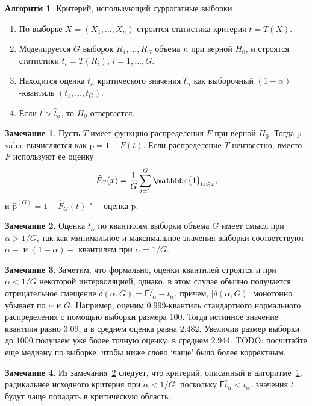 \documentclass[specialist,
substylefile = spbu_report.rtx,
subf,href,colorlinks=true, 12pt]{disser}
\theoremstyle{definition}
\newtheorem{algorithm}{Алгоритм}
\newtheorem{remark}{Замечание}
\begin{document}
\begin{algorithm}{Критерий, использующий суррогатные выборки}\label{alg:surrogate}
	\begin{enumerate}
		\item По выборке $X=(X_1,\ldots, X_n)$ строится статистика критерия $t=T(X)$.
		\item Моделируется $G$ выборок $R_1,\ldots, R_G$ объема $n$ при верной $H_0$, и строятся статистики $t_i=T(R_i)$, $i=1,\ldots, G$.
		\item Находится оценка $t_\alpha$ критического значения $\hat t_\alpha$ как выборочный $(1-\alpha)$-квантиль $(t_1,\ldots,t_G)$.
		\item Если $t>\hat t_\alpha$, то $H_0$ отвергается.
	\end{enumerate}
\end{algorithm}

\begin{remark}
	Пусть $T$ имеет функцию распределения $F$ при верной $H_0$. Тогда p-value вычисляется как $\mathrm p= 1-F(t)$. Если распределение $T$ неизвестно, вместо $F$ используют ее оценку
	\[
		\hat F_G(x)=\frac{1}G\sum_{i=1}^G \mathbbm{1}_{t_i\leqslant x},
	\]
	и $\hat {\mathrm p}^{(G)} = 1 - \hat F_G(t)$ "--- оценка $\mathrm p$.
\end{remark}

\begin{remark}\label{rem:assumption1}
	Оценка $t_\alpha$ по квантилям выборки объема $G$ имеет смысл при $\alpha>1/G$, так как минимальное и максимальное значения выборки соответствуют $\alpha-$ и $(1-\alpha)-$ квантилям при $\alpha = 1/G$.
\end{remark}

\begin{remark}
Заметим, что формально, оценки квантилей строятся и при $\alpha < 1/G$ некоторой интерволяцией, однако, в этом случае обычно получается отрицательное смещение $\delta(\alpha,G)=\mathsf E\hat t_\alpha - t_\alpha$, причем, $|\delta(\alpha, G)|$ монотонно убывает по $\alpha$ и $G$.
	Например, оценим $0.999$-квантиль стандартного нормального распределения с помощью выборки размера $100$. Тогда истинное значение квантиля равно $3.09$, а в среднем оценка равна $2.482$. Увеличив размер выборки до $1000$ получаем уже более точную оценку: в среднем $2.944$.
TODO: посчитайте еще медиану по выборке, чтобы ниже слово `чаще' было более корректным.
\end{remark}

\begin{remark}\label{remark:liberal0}
	Из замечания~\ref{rem:assumption1} следует, что критерий, описанный в алгоритме~\ref{alg:surrogate}, радикальнее исходного критерия при $\alpha < 1/G$: поскольку $\mathsf E\hat t_\alpha < t_\alpha$, значения $t$ будут чаще попадать в критическую область.
\end{remark}
\end{document}
